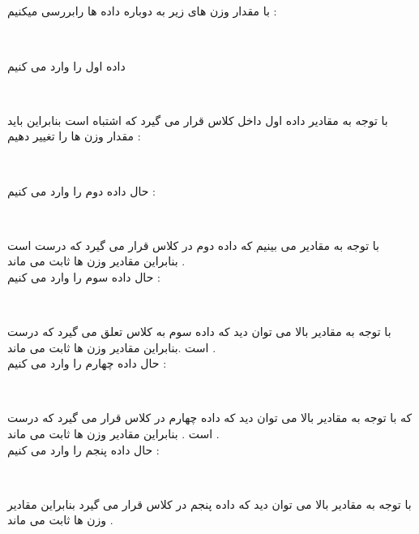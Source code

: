 \documentclass{article}
\begin{document}
\subsection*{}
با مقدار وزن های زیر به دوباره داده ها رابررسی میکنیم : 
\begin{center}
	\\
\end{center}
داده اول را وارد می کنیم 
\begin{center}
	\\
\end{center}
با توجه به مقادیر داده اول داخل کلاس 
قرار می گیرد که اشتباه است بنابراین باید مقدار وزن ها را تغییر دهیم   : 
\begin{center}
	\\
\end{center}
حال داده دوم را وارد می کنیم :
\begin{center}
	\\
\end{center}
با توجه به مقادیر می بینیم که داده دوم در کلاس 
قرار می گیرد که درست است بنابراین مقادیر وزن ها ثابت می ماند  . \\
حال داده سوم را وارد می کنیم  : 
\begin{center}
	\\
\end{center}
با توجه به مقادیر بالا می توان دید که داده سوم به کلاس 
تعلق می گیرد که درست است .بنابراین مقادیر وزن ها ثابت می ماند  . \\
حال  داده چهارم را وارد می کنیم  : 
\begin{center}
	\\
\end{center}
که با توجه به مقادیر بالا می توان دید که داده چهارم در کلاس 
قرار می گیرد که درست است . بنابراین مقادیر وزن ها ثابت می ماند  . \\
حال داده پنجم را وارد می کنیم  : 
\begin{center}
	\\
\end{center}
با توجه به مقادیر بالا می توان دید که داده پنجم در کلاس 
قرار می گیرد بنابراین مقادیر وزن ها ثابت می ماند  . 
\end{document}
